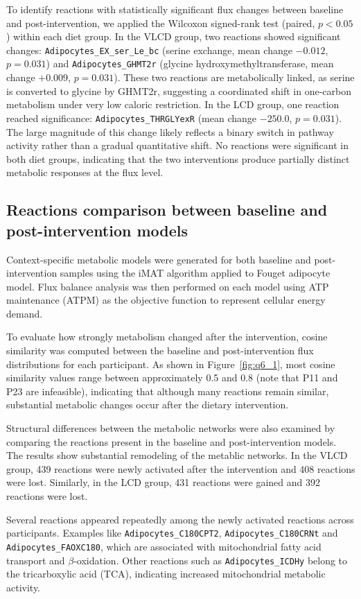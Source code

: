 \documentclass[11pt, a4paper]{article}
\newcommand{\rxn}[1]{\texttt{#1}}          %
\begin{document}
To identify reactions with statistically significant flux changes between baseline and post-intervention, we applied the Wilcoxon signed-rank test (paired, $p < 0.05$) within each diet group. In the VLCD group, two reactions showed significant changes: \rxn{Adipocytes\_EX\_ser\_Le\_bc} (serine exchange, mean change $-0.012$, $p = 0.031$) and \rxn{Adipocytes\_GHMT2r} (glycine hydroxymethyltransferase, mean change $+0.009$, $p = 0.031$). These two reactions are metabolically linked, as serine is converted to glycine by GHMT2r, suggesting a coordinated shift in one-carbon metabolism under very low caloric restriction. In the LCD group, one reaction reached significance: \rxn{Adipocytes\_THRGLYexR} (mean change $-250.0$, $p = 0.031$). The large magnitude of this change likely reflects a binary switch in pathway activity rather than a gradual quantitative shift. No reactions were significant in both diet groups, indicating that the two interventions produce partially distinct metabolic responses at the flux level.

\subsection{Reactions comparison between baseline and post-intervention models}
Context-specific metabolic models were generated for both baseline and post-intervention samples using the iMAT algorithm applied to Fouget adipocyte model. Flux balance analysis was then performed on each model using ATP maintenance (ATPM) as the objective function to represent cellular energy demand.

To evaluate how strongly metabolism changed after the intervention, cosine similarity was computed between the baseline and post-intervention flux distributions for each participant. As shown in Figure~\ref{fig:q6_1}, most cosine similarity values range between approximately 0.5 and 0.8 (note that P11 and P23 are infeasible), indicating that although many reactions remain similar, substantial metabolic changes occur after the dietary intervention.

Structural differences between the metabolic networks were also examined by comparing the reactions present in the baseline and post-intervention models. The results show substantial remodeling of the metablic networks. In the VLCD group, 439 reactions were newly activated after the intervention and 408 reactions were lost. Similarly, in the LCD group, 431 reactions were gained and 392 reactions were lost.

Several reactions appeared repeatedly among the newly activated reactions across participants. Examples like \rxn{Adipocytes\_C180CPT2}, \rxn{Adipocytes\_C180CRNt} and \rxn{Adipocytes\_FAOXC180}, which are associated with mitochondrial fatty acid transport and $\beta$-oxidation. Other reactions such as \rxn{Adipocytes\_ICDHy} belong to the tricarboxylic acid (TCA), indicating increased mitochondrial metabolic activity.
\end{document}
